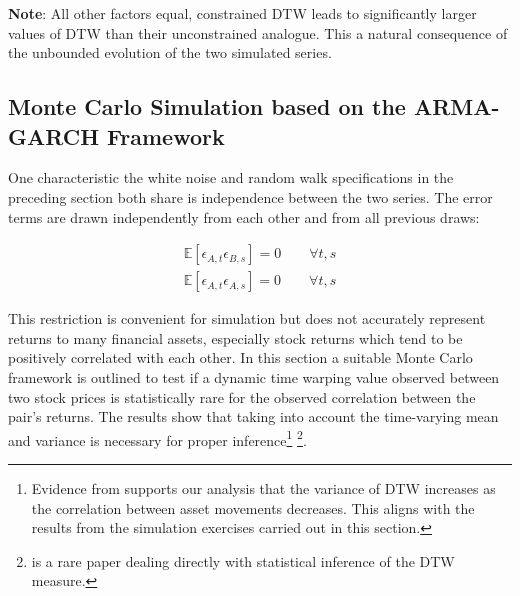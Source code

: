 \begin{table}[!ht]
\begin{threeparttable}
\begin{tablenotes}
            \item {\textbf{Note}: All other factors equal, constrained DTW leads to significantly larger values of DTW than their unconstrained analogue. This a natural consequence of the unbounded evolution of the two simulated series.}
        \end{tablenotes}
    \end{threeparttable}
\end{table}


\subsection{Monte Carlo Simulation based on the ARMA-GARCH Framework} \label{sec:MC_sim_arma_garch}

One characteristic the white noise and random walk specifications in the preceding section both share is independence between the two series. The error terms are drawn independently from each other and from all previous draws:

\begin{align}
    \mathbb{E}[\epsilon_{A,t}\epsilon_{B,s}] = 0 \quad \quad \forall t,s \\
    \mathbb{E}[\epsilon_{A,t}\epsilon_{A,s}] = 0 \quad \quad \forall t,s
\end{align}

This restriction is convenient for simulation but does not accurately represent returns to many financial assets, especially stock returns which tend to be positively correlated with each other. In this section a suitable Monte Carlo framework is outlined to test if a dynamic time warping value observed between two stock prices is statistically rare for the observed correlation between the pair's returns. The results show that taking into account the time-varying mean and variance is necessary for proper inference\footnote{Evidence from \cite{Ito_Sakemoto_2020} supports our analysis that the variance of DTW increases as the correlation between asset movements decreases. This aligns with the results from the simulation exercises carried out in this section.} \footnote{\cite{DuyTakeuchi2023statistical} is a rare paper dealing directly with statistical inference of the DTW measure.
}.

